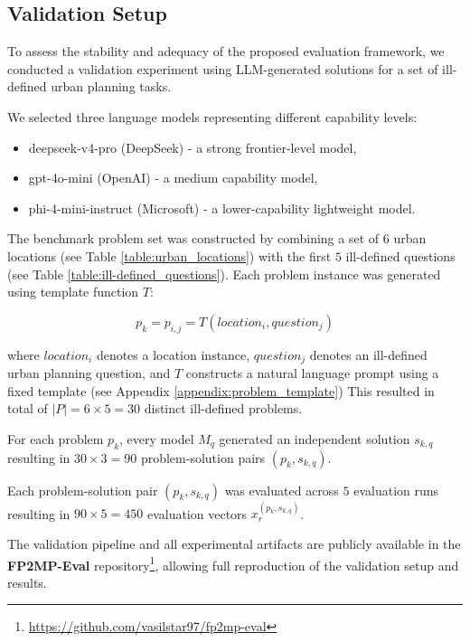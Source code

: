 \subsection{Validation Setup}

To assess the stability and adequacy of the proposed evaluation framework, we conducted a validation experiment using LLM-generated solutions for a set of ill-defined urban planning tasks.

We selected three language models representing different capability levels:

\begin{itemize}
    \item deepseek-v4-pro (DeepSeek) - a strong frontier-level model,
    \item gpt-4o-mini (OpenAI) - a medium capability model,
    \item phi-4-mini-instruct (Microsoft) - a lower-capability lightweight model.
\end{itemize}

The benchmark problem set was constructed by combining a set of $6$ urban locations (see Table \ref{table:urban_locations}) with the first $5$ ill-defined questions (see Table \ref{table:ill-defined_questions}).
Each problem instance was generated using template function $T$:

\[
p_k = p_{i,j} = T(location_i, question_j)
\]

where $location_i$ denotes a location instance, $question_j$ denotes an ill-defined urban planning question, and $T$ constructs a natural language prompt using a fixed template (see Appendix \ref{appendix:problem_template})
This resulted in total of $|P| = 6 \times 5 = 30$ distinct ill-defined problems.

For each problem $p_k$, every model $M_q$ generated an independent solution $s_{k,q}$ resulting in $30 \times 3 = 90$ problem-solution pairs $(p_k, s_{k,q})$.

Each problem-solution pair $(p_k, s_{k,q})$ was evaluated across $5$ evaluation runs resulting in $90 \times 5 = 450$ evaluation vectors $x_r^{(p_k, s_{k,q})}$.

The validation pipeline and all experimental artifacts are publicly available in the \textbf{FP2MP-Eval} repository\footnote{\url{https://github.com/vasilstar97/fp2mp-eval}}, allowing full reproduction of the validation setup and results.